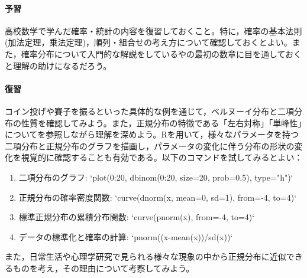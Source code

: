 \paragraph{予習}
高校数学で学んだ確率・統計の内容を復習しておくこと。特に，確率の基本法則(加法定理，乗法定理)，順列・組合せの考え方について確認しておくとよい。また，確率分布について入門的な解説をしている\textcite{Hamada201812}や\textcite{Maeda2017}の最初の数章に目を通しておくと理解の助けになるだろう。
\paragraph{復習}
コイン投げや賽子を振るといった具体的な例を通じて，ベルヌーイ分布と二項分布の性質を確認してみよう。また，正規分布の特徴である「左右対称」「単峰性」について\textcite{Naganuma2201611}を参照しながら理解を深めよう。Rを用いて，様々なパラメータを持つ二項分布と正規分布のグラフを描画し，パラメータの変化に伴う分布の形状の変化を視覚的に確認することも有効である。以下のコマンドを試してみるとよい：

\begin{enumerate}
\item 二項分布のグラフ: `plot(0:20, dbinom(0:20, size=20, prob=0.5), type="h")`
\item 正規分布の確率密度関数: `curve(dnorm(x, mean=0, sd=1), from=-4, to=4)`
\item 標準正規分布の累積分布関数: `curve(pnorm(x), from=-4, to=4)`
\item データの標準化と確率の計算: `pnorm((x-mean(x))/sd(x))`
\end{enumerate}

また，日常生活や心理学研究で見られる様々な現象の中から正規分布に近似できるものを考え，その理由について考察してみよう。